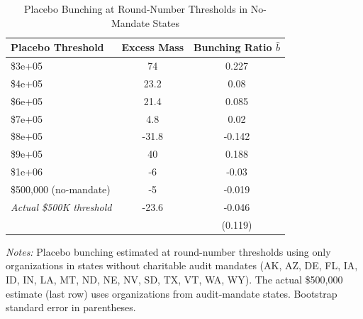 \begin{table}[t]
\centering
\caption{Placebo Bunching at Round-Number Thresholds in No-Mandate States}
\label{tab:placebo}
\begin{tabular}{lcc}
\hline\hline
Placebo Threshold & Excess Mass & Bunching Ratio $\hat{b}$ \\
\hline
\$3e+05 & 74 & 0.227 \\
\$4e+05 & 23.2 & 0.08 \\
\$6e+05 & 21.4 & 0.085 \\
\$7e+05 & 4.8 & 0.02 \\
\$8e+05 & -31.8 & -0.142 \\
\$9e+05 & 40 & 0.188 \\
\$1e+06 & -6 & -0.03 \\
\$500,000 (no-mandate) & -5 & -0.019 \\
\hline
\textit{Actual \$500K threshold} & -23.6 & -0.046 \\
 & & (0.119) \\
\hline\hline
\end{tabular}
\begin{tablenotes}[flushleft]
\small
\item \textit{Notes:} Placebo bunching estimated at round-number thresholds using only organizations in states without charitable audit mandates (AK, AZ, DE, FL, IA, ID, IN, LA, MT, ND, NE, NV, SD, TX, VT, WA, WY). The actual \$500,000 estimate (last row) uses organizations from audit-mandate states. Bootstrap standard error in parentheses.
\end{tablenotes}
\end{table}
